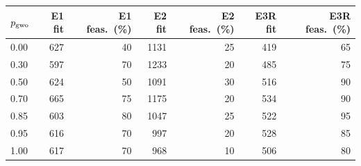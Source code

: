 \begin{tabular}{lrrrrrr}
\toprule
$p_{\rm gwo}$ & E1 fit & E1 feas.\ (\%) & E2 fit & E2 feas.\ (\%) & E3R fit & E3R feas.\ (\%)\\
\midrule
0.00 & 627 & 40 & 1131 & 25 & 419 & 65\\
0.30 & 597 & 70 & 1233 & 20 & 485 & 75\\
0.50 & 624 & 50 & 1091 & 30 & 516 & 90\\
0.70 & 665 & 75 & 1175 & 20 & 534 & 90\\
0.85 & 603 & 80 & 1047 & 25 & 522 & 95\\
0.95 & 616 & 70 & 997 & 20 & 528 & 85\\
1.00 & 617 & 70 & 968 & 10 & 506 & 80\\
\bottomrule
\end{tabular}